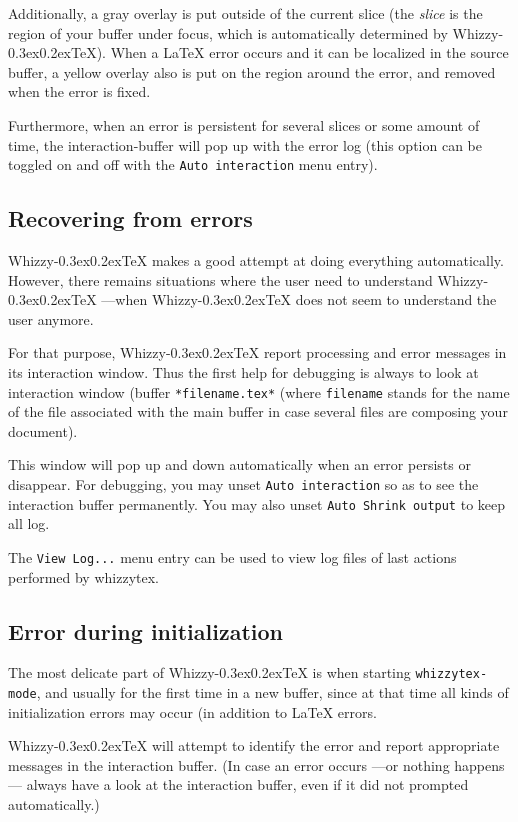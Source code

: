 \documentclass[12pt]{article}
\makeatletter
\let \lst \verb
\def \whizzy {{Whizzy\kern -0.3ex\raise 0.2ex\hbox{\let \@\relax\TeX}}}
\makeatother
\begin{document}
Additionally, a gray overlay is put outside of the current slice (the {\em
slice} is the region of your buffer under focus, which is automatically
determined by {\whizzy}). When a {\LaTeX} error occurs and it can be
localized in the source buffer, a yellow overlay also is put on the region
around the error, and removed when the error is fixed.

Furthermore, when an error is persistent for several slices or some amount
of time, the interaction-buffer will pop up with the error log
(this option can be toggled on and off with the {\tt Auto interaction} menu
entry).  

\subsection {Recovering from errors}

{\whizzy} makes a good attempt at doing everything automatically. 
However, there remains situations where the user need to understand 
{\whizzy} ---when {\whizzy} does not seem to understand the user anymore. 

For that purpose, {\whizzy} report processing and error messages
in its interaction window. Thus the first help for debugging
is always to look at interaction window (buffer 
\lst"*filename.tex*" (where \lst"filename" stands for the name of the file
associated with the main buffer in case several files are composing your
document). 

This window will pop up and down automatically when an error persists or
disappear. For debugging, you may unset {\tt Auto interaction} so as to see
the interaction buffer permanently. You may also unset {\tt Auto Shrink
output} to keep all log.

The {\tt View Log...} menu entry can be used to view log files of
last actions performed by whizzytex. 

\subsection {Error during initialization}

The most delicate part of {\whizzy} is when starting {\tt whizzytex-mode},
and usually for the first time in a new buffer, since at that time all kinds
of initialization errors may occur (in addition to {\LaTeX} errors. 

{\whizzy} will attempt to identify the error and report appropriate messages
in the interaction buffer. (In case an error occurs ---or nothing happens---
always have a look at the interaction buffer, even if it did not prompted
automatically.)
\end{document}
